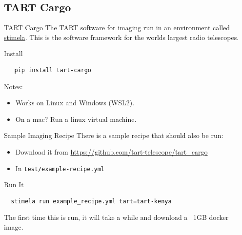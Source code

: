 \documentclass[ignorenonframetext]{beamer}
\begin{document}
\subsection{TART Cargo}

\begin{frame}[fragile]{TART Cargo}
  The TART software for imaging run in an environment called \href{https://github.com/caracal-pipeline/stimela}{stimela}. This is the software framework for the worlds largest radio telescopes.

  \begin{block}{Install}
  \begin{verbatim}
   pip install tart-cargo
  \end{verbatim}
  \end{block}

  Notes:
  \begin{itemize}
   \item Works on Linux and Windows (WSL2).
   \item On a mac? Run a linux virtual machine.
  \end{itemize}

\end{frame}


\begin{frame}[fragile]{Sample Imaging Recipe}
There is a sample recipe that should also be run:
\begin{itemize}
 \item Download it from \url{https://github.com/tart-telescope/tart_cargo}
 \item In \verb!test/example-recipe.yml!
\end{itemize}
\begin{block}{Run It}
 \begin{verbatim}
  stimela run example_recipe.yml tart=tart-kenya
 \end{verbatim}
\end{block}
 The first time this is run, it will take a while and download a ~1GB docker image.
\end{frame}
\end{document}
